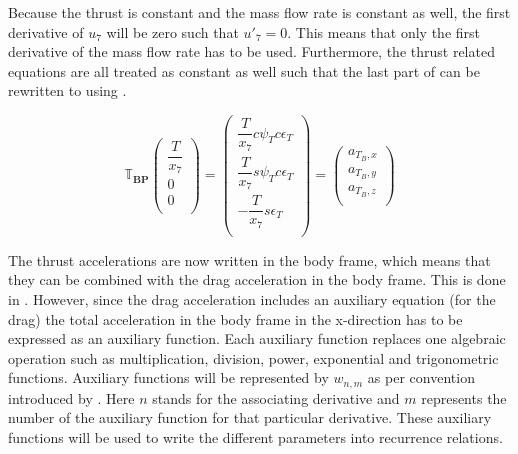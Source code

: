 Because the thrust is constant and the mass flow rate is constant as well, the first derivative of $u_{7}$ will be zero such that $u'_{7}=0$. This means that only the first derivative of the mass flow rate has to be used. Furthermore, the thrust related equations are all treated as constant as well such that the last part of  can be rewritten to  using .

\begin{equation} \label{eq:aTB}
\mathbb{T}_{\mathbf{BP}}
\begin{pmatrix}
\dfrac{T}{x_{7}}\\
0\\
0\\
\end{pmatrix}
=
\begin{pmatrix}
\dfrac{T}{x_{7}}c\psi_{T}c\epsilon_{T}\\
\dfrac{T}{x_{7}}s\psi_{T}c\epsilon_{T}\\
-\dfrac{T}{x_{7}}s\epsilon_{T}\\
\end{pmatrix}
=
\begin{pmatrix}
a_{T_{B},x}\\
a_{T_{B},y}\\
a_{T_{B},z}\\
\end{pmatrix}
\end{equation}


The thrust accelerations are now written in the body frame, which means that they can be combined with the drag acceleration in the body frame. This is done in . However, since the drag acceleration includes an auxiliary equation (for the drag) the total acceleration in the body frame in the x-direction has to be expressed as an auxiliary function. Each auxiliary function replaces one algebraic operation such as multiplication, division, power, exponential and trigonometric functions. Auxiliary functions will be represented by $w_{n,m}$ as per convention introduced by \cite{scott2008high}. Here $n$ stands for the associating derivative and $m$ represents the number of the auxiliary function for that particular derivative. These auxiliary functions will be used to write the different parameters into recurrence relations.


